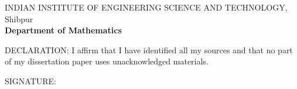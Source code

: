 \begin{titlepage}
\begin{center}
        \vspace{1cm}

        \Large{{
                INDIAN INSTITUTE OF ENGINEERING SCIENCE AND TECHNOLOGY, Shibpur\\ 
                \textbf{Department of Mathematics}
        }}

        \vspace{3cm}

        \large{DECLARATION: I affirm that I have identified all my sources and that no part of my dissertation paper uses unacknowledged materials.}
    \end{center}
    \large{SIGNATURE:}
\end{titlepage}
